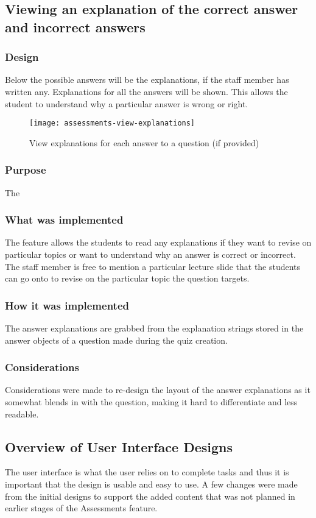 \subsection{Viewing an explanation of the correct answer and incorrect answers}

\subsubsection{Design}
Below the possible answers will be the explanations, if the staff member has written any. Explanations for all the answers will be shown. This allows the student to understand why a particular answer is wrong or right.

\begin{figure}[h!]
	\centering
	\texttt{[image: assessments-view-explanations]}
	\caption{View explanations for each answer to a question (if provided)}
\end{figure}

\subsubsection{Purpose}
The 

\subsubsection{What was implemented}
The feature allows the students to read any explanations if they want to revise on particular topics or want to understand why an answer is correct or incorrect. The staff member is free to mention a particular lecture slide that the students can go onto to revise on the particular topic the question targets.

\subsubsection{How it was implemented}
The answer explanations are grabbed from the explanation strings stored in the answer objects of a question made during the quiz creation.

\subsubsection{Considerations}
Considerations were made to re-design the layout of the answer explanations as it somewhat blends in with the question, making it hard to differentiate and less readable.

\subsection{Overview of User Interface Designs}
The user interface is what the user relies on to complete tasks and thus it is important that the design is usable and easy to use. A few changes were made from the initial designs to support the added content that was not planned in earlier stages of the Assessments feature.

